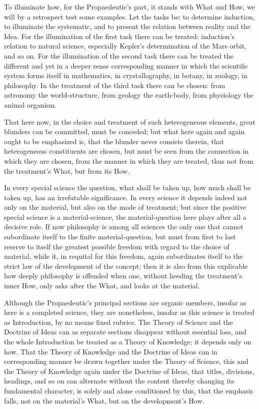 \documentclass[12pt]{book}
\begin{document}
To illuminate how, for the Propaedeutic's part, it stands with What and How, we will by a retrospect test
some examples. Let the tasks be: to determine induction, to illuminate the systematic, and to present the
relation between reality and the Idea. For the illumination of the first task there can be treated:
induction's relation to natural science, especially Kepler's determination of the Mars orbit, and so on.
For the illumination of the second task there can be treated the different and yet in a deeper sense
corresponding manner in which the scientific system forms itself in mathematics, in crystallography, in
botany, in zoology, in philosophy. In the treatment of the third task there can be chosen: from astronomy
the world-structure, from geology the earth-body, from physiology the animal organism.

That here now, in the choice and treatment of such heterogeneous elements, great blunders can be committed,
must be conceded; but what here again and again ought to be emphasized is, that the blunder never consists
therein, that heterogeneous constituents are chosen, but must be seen from the connection in which they are
chosen, from the manner in which they are treated, thus not from the treatment's What, but from its How.

In every special science the question, what shall be taken up, how much shall be taken up, has an
irrefutable significance. In every science it depends indeed not only on the material, but also on the mode
of treatment; but since the positive special science is a material-science,
the material-question here plays after all a decisive role. If now philosophy is among all sciences the only
one that cannot subordinate itself to the finite material-question, but must from first to last reserve to
itself the greatest possible freedom with regard to the choice of material, while it, in requital for this
freedom, again subordinates itself to the strict law of the development of the concept; then it is also from
this explicable how deeply philosophy is offended when one, without heeding the treatment's inner How, only
asks after the What, and looks at the material.

Although the Propaedeutic's principal sections are organic members, insofar as here is a completed science,
they are nonetheless, insofar as this science is treated as Introduction, by no means fixed rubrics. The
Theory of Science and the Doctrine of Ideas can as separate sections disappear without essential loss, and
the whole Introduction be treated as a Theory of Knowledge; it depends only on how. That the Theory of
Knowledge and the Doctrine of Ideas can in corresponding manner be drawn together under the Theory of
Science, this and the Theory of Knowledge again under the Doctrine of Ideas, that titles, divisions,
headings, and so on can alternate without the content thereby changing its fundamental character, is solely
and alone conditioned by this, that the emphasis falls, not on the material's What, but on the development's
How.
\end{document}
